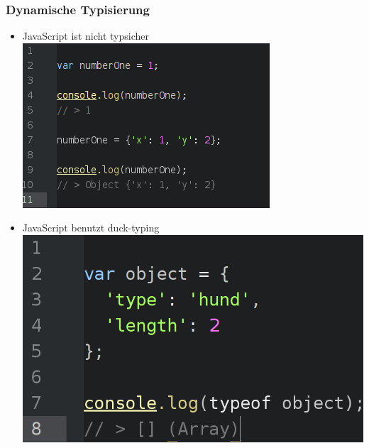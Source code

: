 \documentclass{beamer}
\begin{document}
\begin{frame}
\frametitle{Dynamische Typisierung}
\begin{itemize}
\item JavaScript ist nicht typsicher
\\
\includegraphics[scale=0.4]{assets/type-safety.png}
\item JavaScript benutzt duck-typing
\\
\includegraphics[scale=0.2]{assets/duck.png}
\end{itemize}
\end{frame}



\end{document}
